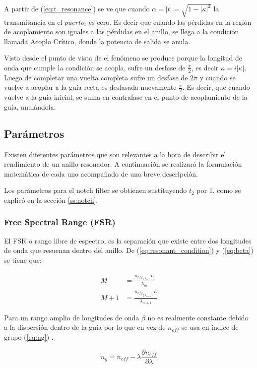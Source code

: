 A partir de (\ref{eq:t_resonance}) se ve que cuando $\alpha=|t|=\sqrt{1-|\kappa|^2}$ la transmitancia
en el $puerto_t$ es cero. Es decir que cuando las pérdidas en la región de 
acoplamiento son iguales a las pérdidas en el anillo, se llega a la condición
llamada Acoplo Crítico, donde la potencia de salida se anula.

Visto desde el punto de vista de \cite{blasco2011desarrollo} el fenómeno se 
produce porque la longitud de onda que cumple la condición se acopla, sufre un 
desfase de $\frac{\pi}{2}$, es decir $\kappa = i|\kappa|$. 
Luego de completar una vuelta completa sufre un desfase de $2\pi$ y cuando
se vuelve a acoplar a la guía recta es desfasada nuevamente $\frac{\pi}{2}$.
Es decir, que cuando vuelve a la guía inicial, se suma en contrafase en el 
punto de acoplamiento de la guía, anulándola.

\subsection{Parámetros}

Existen diferentes parámetros que son relevantes a la hora de describir el rendimiento
de un anillo resonador. A continuación se realizará la formulación matemática de 
cada uno acompañado de una breve descripción.

Los parámetros para el notch filter se obtienen sustituyendo $t_2$ por 1, como se explicó en
la sección \ref{ss:notch}.

\subsubsection{Free Spectral Range (FSR)}
El FSR o rango libre de espectro, es la separación que existe entre dos longitudes
de onda que resuenan dentro del anillo. De (\ref{eq:resonant_condition}) y
(\ref{eq:beta}) se tiene que:

\begin{align}
M&=\frac{n_{eff_{(\lambda_m)}} L}{\lambda_m} \label{eq:mode_l} \\
M+1&=\frac{n_{eff_{(\lambda_{m+1})}} L}{\lambda_{m+1}} \label{eq:mode_l+1}
\end{align} 

Para un rango amplio de longitudes de onda $\beta$ no es realmente 
constante debido a la dispersión dentro de la guía por lo que en vez de $n_{eff}$
se usa en índice de grupo (\ref{eq:ng}) \cite{paloczi2005polymer}.

\begin{equation}
n_g=n_{eff} - \lambda \frac{\partial n_{eff}}{\partial \lambda}
\label{eq:ng}
\end{equation} 

